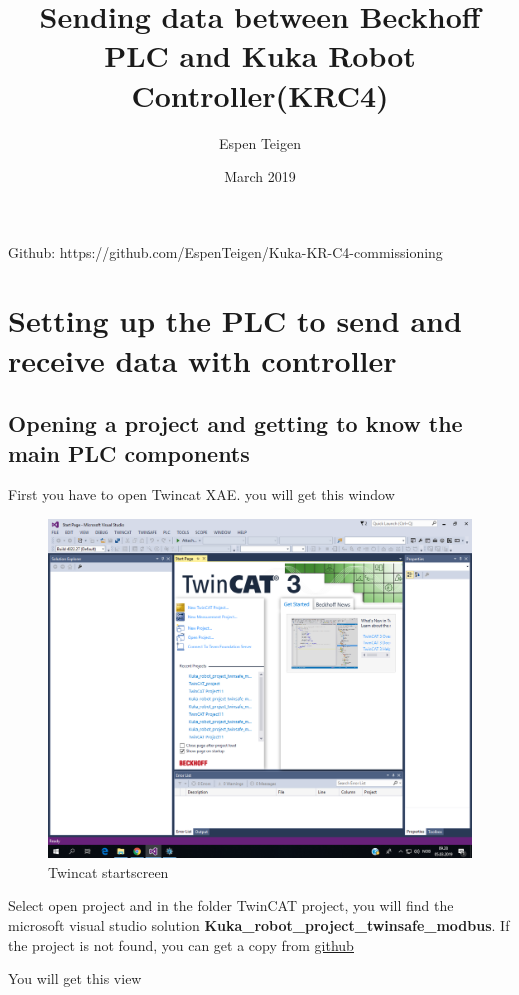 \documentclass{article}
\title{Sending data between Beckhoff PLC and Kuka Robot Controller(KRC4)}
\author{Espen Teigen }
\date{March 2019}
\begin{document}
\maketitle

    Github: https://github.com/EspenTeigen/Kuka-KR-C4-commissioning

\newpage
\section{Setting up the PLC to send and receive data with controller}

\subsection{Opening a project and getting to know the main PLC components}
First you have to open Twincat XAE. you will get this window

\begin{figure}[!h]
    \centering
    \includegraphics[width=\textwidth]{pictures/TC3_overview/TC3_startscreen.png}
    \caption{Twincat startscreen}
    \label{fig:my_label}
\end{figure}

Select open project and in the folder TwinCAT project, you will find the microsoft visual studio solution \textbf{Kuka\_robot\_project\_twinsafe\_modbus}. If the project is not found, you can get a copy from \href{https://github.com/EspenTeigen/Kuka-KR-C4-commissioning}{\underline{github}}

\newpage
You will get this view
\end{document}
